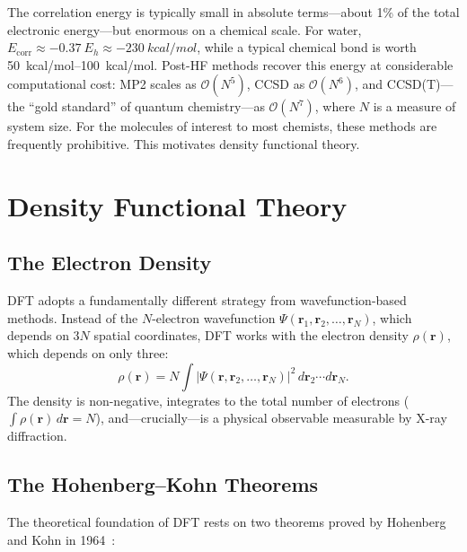 \documentclass[11pt]{article}
\numberwithin{equation}{section}
\begin{document}
The correlation energy is typically small in absolute terms---about 1\% of the total electronic energy---but enormous on a chemical scale. For water, $E_\text{corr} \approx \SI{-0.37}{E_h} \approx \SI{-230}{kcal/mol}$, while a typical chemical bond is worth \SIrange{50}{100}{kcal/mol}. Post-HF methods recover this energy at considerable computational cost: MP2 scales as $\mathcal{O}(N^5)$, CCSD as $\mathcal{O}(N^6)$, and CCSD(T)---the ``gold standard'' of quantum chemistry---as $\mathcal{O}(N^7)$, where $N$ is a measure of system size. For the molecules of interest to most chemists, these methods are frequently prohibitive. This motivates density functional theory.


\section{Density Functional Theory}
\label{sec:DFT}

\subsection{The Electron Density}

DFT adopts a fundamentally different strategy from wavefunction-based methods. Instead of the $N$-electron wavefunction $\Psi(\mathbf{r}_1, \mathbf{r}_2, \ldots, \mathbf{r}_N)$, which depends on $3N$ spatial coordinates, DFT works with the electron density $\rho(\mathbf{r})$, which depends on only three:
\begin{equation}
\rho(\mathbf{r}) = N\int |\Psi(\mathbf{r}, \mathbf{r}_2, \ldots, \mathbf{r}_N)|^2\,d\mathbf{r}_2\cdots d\mathbf{r}_N.
\label{eq:density}
\end{equation}
The density is non-negative, integrates to the total number of electrons ($\int \rho(\mathbf{r})\,d\mathbf{r} = N$), and---crucially---is a physical observable measurable by X-ray diffraction.

\subsection{The Hohenberg--Kohn Theorems}

The theoretical foundation of DFT rests on two theorems proved by Hohenberg and Kohn in 1964~\cite{HohenbergKohn1964}:
\end{document}
